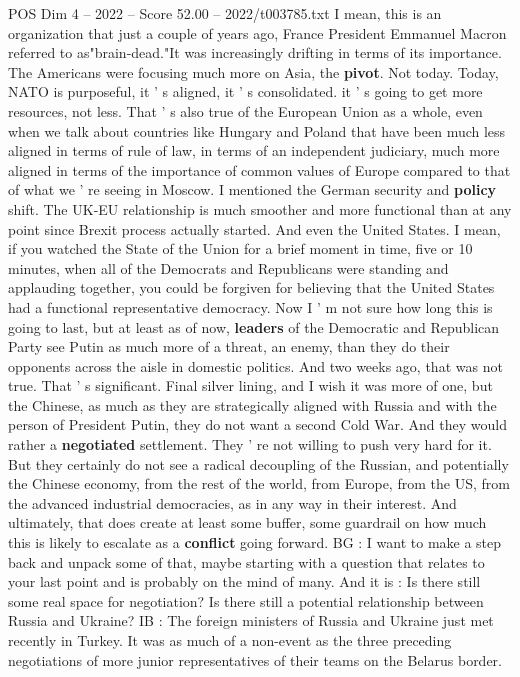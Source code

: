 \begin{textsample}{POS Dim 4 – 2022 – Score 52.00 – 2022/t003785.txt}
I mean, this is an organization that just a couple of years ago, France President Emmanuel Macron referred to as"brain-dead."It was increasingly drifting in terms of its importance.
The Americans were focusing much more on Asia, the \textbf{pivot}.
Not today.
Today, NATO is purposeful, it ' s aligned, it ' s consolidated. it ' s going to get more resources, not less.
That ' s also true of the European Union as a whole, even when we talk about countries like Hungary and Poland that have been much less aligned in terms of rule of law, in terms of an independent judiciary, much more aligned in terms of the importance of common values of Europe compared to that of what we ' re seeing in Moscow.
I mentioned the German security and \textbf{policy} shift.
The UK-EU relationship is much smoother and more functional than at any point since Brexit process actually started.
And even the United States.
I mean, if you watched the State of the Union for a brief moment in time, five or 10 minutes, when all of the Democrats and Republicans were standing and applauding together, you could be forgiven for believing that the United States had a functional representative democracy.
Now I ' m not sure how long this is going to last, but at least as of now, \textbf{leaders} of the Democratic and Republican Party see Putin as much more of a threat, an enemy, than they do their opponents across the aisle in domestic politics.
And two weeks ago, that was not true.
That ' s significant.
Final silver lining, and I wish it was more of one, but the Chinese, as much as they are strategically aligned with Russia and with the person of President Putin, they do not want a second Cold War.
And they would rather a \textbf{negotiated} settlement.
They ' re not willing to push very hard for it.
But they certainly do not see a radical decoupling of the Russian, and potentially the Chinese economy, from the rest of the world, from Europe, from the US, from the advanced industrial democracies, as in any way in their interest.
And ultimately, that does create at least some buffer, some guardrail on how much this is likely to escalate as a \textbf{conflict} going forward.
BG : I want to make a step back and unpack some of that, maybe starting with a question that relates to your last point and is probably on the mind of many.
And it is : Is there still some real space for negotiation?
Is there still a potential relationship between Russia and Ukraine?
IB : The foreign ministers of Russia and Ukraine just met recently in Turkey.
It was as much of a non-event as the three preceding negotiations of more junior representatives of their teams on the Belarus border.

\end{textsample}
